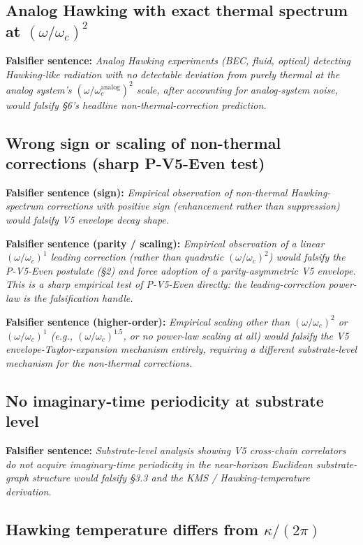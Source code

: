 \documentclass[11pt,a4paper]{article}
\begin{document}
\subsection{Analog Hawking with exact thermal spectrum at $(\omega/\omega_c)^2$}

\textbf{Falsifier sentence:} \emph{Analog Hawking experiments (BEC, fluid, optical) detecting Hawking-like radiation with no detectable deviation from purely thermal at the analog system's $(\omega/\omega_c^\mathrm{analog})^2$ scale, after accounting for analog-system noise, would falsify \S6's headline non-thermal-correction prediction.}

\subsection{Wrong sign or scaling of non-thermal corrections (sharp P-V5-Even test)}

\textbf{Falsifier sentence (sign):} \emph{Empirical observation of non-thermal Hawking-spectrum corrections with positive sign (enhancement rather than suppression) would falsify V5 envelope decay shape.}

\textbf{Falsifier sentence (parity / scaling):} \emph{Empirical observation of a linear $(\omega/\omega_c)^1$ leading correction (rather than quadratic $(\omega/\omega_c)^2$) would falsify the P-V5-Even postulate (\S2) and force adoption of a parity-asymmetric V5 envelope. This is a sharp empirical test of P-V5-Even directly: the leading-correction power-law is the falsification handle.}

\textbf{Falsifier sentence (higher-order):} \emph{Empirical scaling other than $(\omega/\omega_c)^2$ or $(\omega/\omega_c)^1$ (e.g., $(\omega/\omega_c)^{1.5}$, or no power-law scaling at all) would falsify the V5 envelope-Taylor-expansion mechanism entirely, requiring a different substrate-level mechanism for the non-thermal corrections.}

\subsection{No imaginary-time periodicity at substrate level}

\textbf{Falsifier sentence:} \emph{Substrate-level analysis showing V5 cross-chain correlators do not acquire imaginary-time periodicity in the near-horizon Euclidean substrate-graph structure would falsify \S3.3 and the KMS / Hawking-temperature derivation.}

\subsection{Hawking temperature differs from $\kappa/(2\pi)$}
\end{document}
